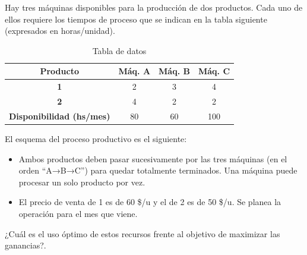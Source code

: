 \documentclass[../main.tex]{subfiles}
\begin{document}
        \begin{exercise}
            Hay tres máquinas disponibles para la producción de dos productos. Cada uno de ellos requiere los tiempos de proceso que se indican en la tabla siguiente (expresados en horas/unidad).
            \begin{table}[ht]
                \centering
                \begin{tabular}{|c|c|c|c|}
                \hline
                \textbf{Producto} & \textbf{Máq. A} & \textbf{Máq. B} & \textbf{Máq. C} \\ \hline
                \textbf{1} &    2      &     3     &    4      \\ \hline
                \textbf{2} &    4      &     2     &    2      \\ \hline
                \textbf{Disponibilidad (hs/mes)} &    80     &    60     &   100     \\ \hline
                \end{tabular}
                \caption{Tabla de datos}
            \end{table}

            El esquema del proceso productivo es el siguiente:
            \begin{itemize}
                \item Ambos productos deben pasar sucesivamente por las tres máquinas (en el orden “A→B→C”) para quedar totalmente terminados. Una máquina puede procesar un solo producto por vez.
                \item El precio de venta de 1 es de 60 \$/u y el de 2 es de 50 \$/u. Se planea la operación para el mes que viene.
            \end{itemize}

            ¿Cuál es el uso óptimo de estos recursos frente al objetivo de maximizar las ganancias?.\\


\end{exercise}
\end{document}

